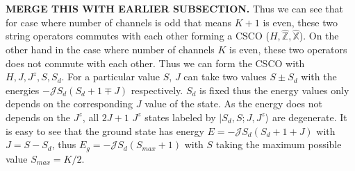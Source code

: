 \documentclass[reprint,prb,superscriptaddress]{revtex4-2}
\begin{document}
\textbf{MERGE THIS WITH EARLIER SUBSECTION.}
Thus we can see that for case where number of channels is odd that means $K+1$ is even, these two string operators commutes with each other forming a CSCO ($H,\hat{\mathbb{Z}},\hat{\mathbb{X}}$). On the other hand in the case where number of channels $K$ is even, these two operators does not commute with each other. Thus we can form the CSCO with $H,J,J^z,S,S_d$. For a particular value $S$, $J$ can take two values $S\pm S_d$ with the energies $-{\mathcal{J}} S_d(S_d+1\mp J)$ respectively. $S_d$ is fixed thus the energy values only depends on the corresponding $J$ value of the state. As the energy does not depends on the $J^z$, all $2J+1$ $J^z$ states labeled by $|S_d,S;J,J^z\rangle$ are degenerate. It is easy to see that the ground state has energy $E=-{\mathcal{J}} S_d(S_d+1+J)$ with  $J=S-S_d$, thus $E_g=-{\mathcal{J}} S_d(S_{max}+1)$ with $S$ taking the maximum possible value $S_{max}=K/2$.
\end{document}
